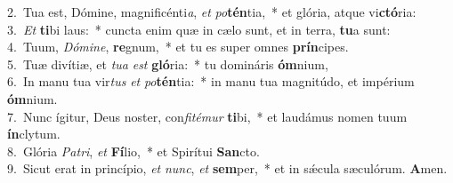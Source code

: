 {2.~}Tua est, Dómine, magnificénti\textit{a}, \textit{et} \textit{po}\textbf{tén}tia,~* et glória, atque vi\textbf{ctó}ria:\\
{3.~}\textit{Et} \textbf{ti}bi laus:~* cuncta enim quæ in cælo sunt, et in terra, \textbf{tu}a sunt:\\
{4.~}Tuum, \textit{Dó}\textit{mi}\textit{ne}, \textbf{re}gnum,~* et tu es super omnes \textbf{prín}cipes.\\
{5.~}Tuæ divítiæ, et \textit{tu}\textit{a} \textit{est} \textbf{gló}ria:~* tu domináris \textbf{óm}nium,\\
{6.~}In manu tua vir\textit{tus} \textit{et} \textit{po}\textbf{tén}tia:~* in manu tua magnitúdo, et impérium \textbf{óm}nium.\\
{7.~}Nunc ígitur, Deus noster, con\textit{fi}\textit{té}\textit{mur} \textbf{ti}bi,~* et laudámus nomen tuum \textbf{ín}clytum.\\
{8.~}Glória \textit{Pa}\textit{tri}, \textit{et} \textbf{Fí}lio,~* et Spirítui \textbf{San}cto.\\
{9.~}Sicut erat in princípio, \textit{et} \textit{nunc}, \textit{et} \textbf{sem}per,~* et in sǽcula sæculórum. \textbf{A}men.\\
